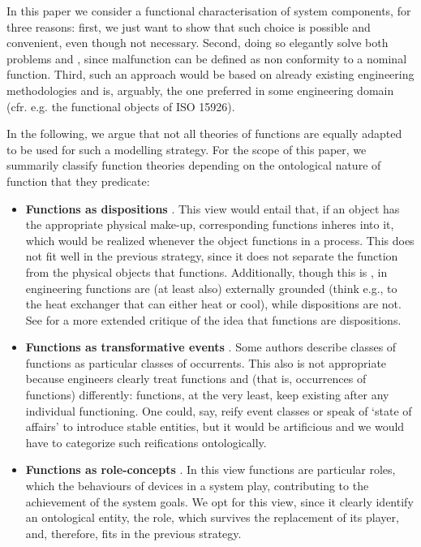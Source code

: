 \documentclass[
]{ceurart}
\begin{document}
In this paper we consider a functional characterisation of system components, for three reasons: first, we just want to show that such choice is possible and convenient, even though not necessary. Second, doing so elegantly solve both problems  and , since malfunction can be defined as non conformity to a nominal function. Third, such an approach would be based on already existing engineering methodologies and is, arguably, the one preferred in some engineering domain (cfr. e.g. the functional objects of ISO 15926).

In the following, we argue that not all theories of functions are equally adapted to be used for such a modelling strategy. 
For the scope of this paper, we summarily classify function theories depending on the ontological nature of function that they predicate:
\begin{itemize}
  \item \textbf{Functions as dispositions} \cite{arpFunctionRoleDisposition2008, barryBasicFormalOntology2015}. This view would entail that, if an object has the appropriate physical make-up, corresponding functions inheres into it, which would be realized whenever the object functions in a process. This does not fit well in the previous strategy, since it does not separate the function from the physical objects that functions. Additionally, though this is , in engineering functions are (at least also) externally grounded (think e.g., to the heat exchanger that can either heat or cool), while dispositions are not. See \cite{rohlWhyFunctionsAre2014} for a more extended critique of the idea that functions are dispositions. %
  \item \textbf{Functions as transformative events} \cite{borgoFormalizationFunctionsOperations2011,borgoCapabilitiesCapacitiesFunctionalities2021, garbaczStandardTaxonomyArtifact2005}. Some authors describe classes of functions as particular classes of occurrents. This also is not appropriate because engineers clearly treat functions and  (that is, occurrences of functions) differently: functions, at the very least, keep existing after any individual functioning. One could, say, reify event classes or speak of `state of affairs' to introduce stable entities, but it would be artificious and we would have to categorize such reifications ontologically. %
  \item \textbf{Functions as role-concepts} \cite{sasajimaFBRLFunctionBehavior1995}. In this view functions are particular roles, which the behaviours of devices in a system play, contributing to the achievement of the system goals. We opt for this view, since it clearly identify an ontological entity, the role, which survives the replacement of its player, and, therefore, fits in the previous strategy. 
\end{itemize}
\end{document}
